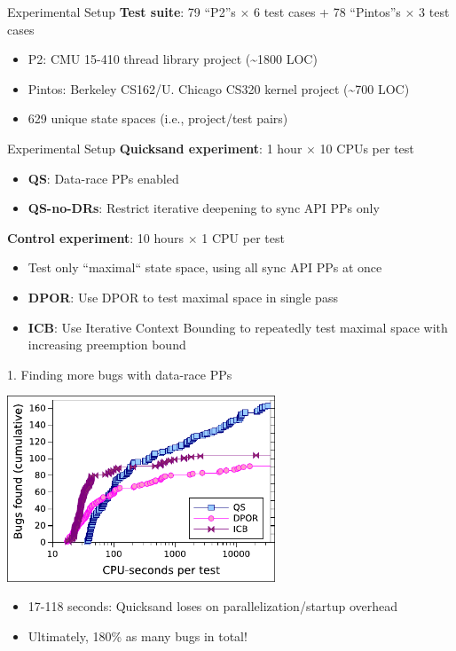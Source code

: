 \documentclass[xcolor=dvipsnames]{beamer}
\begin{document}
\begin{frame}{Experimental Setup}
	\textbf{Test suite}: 79 ``P2''s $\times$ 6 test cases + 78 ``Pintos''s $\times$ 3 test cases
	\begin{itemize}
		\item P2: CMU 15-410 thread library project (\textasciitilde{}1800 LOC)
		\item Pintos: Berkeley CS162/U. Chicago CS320 kernel project (\textasciitilde{}700 LOC)
		\item 629 unique state spaces (i.e., project/test pairs)
	\end{itemize}
\end{frame}
\begin{frame}{Experimental Setup}
	\textbf{Quicksand experiment}: 1 hour $\times$ 10 CPUs per test
	\begin{itemize}
		\item {\bf QS}: Data-race PPs enabled
		\item {\bf QS-no-DRs}: Restrict iterative deepening to sync API PPs only
	\end{itemize}
	\linegap

	{\bf Control experiment}: 10 hours $\times$ 1 CPU per test
	\begin{itemize}
		\item Test only ``maximal`` state space, using all sync API PPs at once
		\item {\bf DPOR}: Use DPOR to test maximal space in single pass
		\item {\bf ICB}: Use Iterative Context Bounding to repeatedly test maximal space with increasing preemption bound
	\end{itemize}
\end{frame}

\begin{frame}{1. Finding more bugs with data-race PPs}
	\begin{center}
		\includegraphics[width=0.6\textwidth]{eval1.pdf}
	\end{center}
	\begin{itemize}
		\item 17-118 seconds: Quicksand loses on parallelization/startup overhead
		\item Ultimately, 180\% as many bugs in total!
	\end{itemize}
\end{frame}
\end{document}
